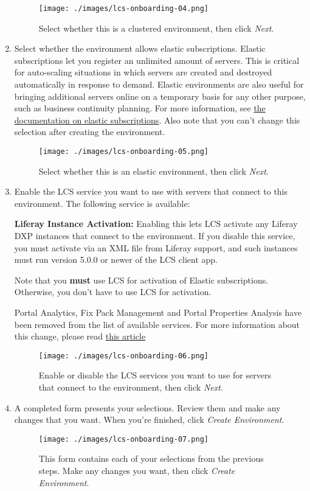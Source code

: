 \begin{enumerate}
  \begin{figure}
  \centering
  \texttt{[image: ./images/lcs-onboarding-04.png]}
  \caption{Select whether this is a clustered environment, then click
  \emph{Next}.}
  \end{figure}
\item
  Select whether the environment allows elastic subscriptions. Elastic
  subscriptions let you register an unlimited amount of servers. This is
  critical for auto-scaling situations in which servers are created and
  destroyed automatically in response to demand. Elastic environments
  are also useful for bringing additional servers online on a temporary
  basis for any other purpose, such as business continuity planning. For
  more information, see
  \href{/docs/7-2/deploy/-/knowledge_base/d/managing-liferay-dxp-subscriptions\#elastic-subscriptions}{the
  documentation on elastic subscriptions}. Also note that you can't
  change this selection after creating the environment.

  \begin{figure}
  \centering
  \texttt{[image: ./images/lcs-onboarding-05.png]}
  \caption{Select whether this is an elastic environment, then click
  \emph{Next}.}
  \end{figure}
\item
  Enable the LCS service you want to use with servers that connect to
  this environment. The following service is available:

  \textbf{Liferay Instance Activation:} Enabling this lets LCS activate
  any Liferay DXP instances that connect to the environment. If you
  disable this service, you must activate via an XML file from Liferay
  support, and such instances must run version 5.0.0 or newer of the LCS
  client app.

  Note that you \textbf{must} use LCS for activation of Elastic
  subscriptions. Otherwise, you don't have to use LCS for activation.

  Portal Analytics, Fix Pack Management and Portal Properties Analysis
  have been removed from the list of available services. For more
  information about this change, please read
  \href{https://help.liferay.com/hc/en-us/articles/360037317691-Liferay-Connected-Services-Feature-Deprecation-Update-March-2020}{this
  article}

  \begin{figure}
  \centering
  \texttt{[image: ./images/lcs-onboarding-06.png]}
  \caption{Enable or disable the LCS services you want to use for
  servers that connect to the environment, then click \emph{Next}.}
  \end{figure}
\item
  A completed form presents your selections. Review them and make any
  changes that you want. When you're finished, click \emph{Create
  Environment}.

  \begin{figure}
  \centering
  \texttt{[image: ./images/lcs-onboarding-07.png]}
  \caption{This form contains each of your selections from the previous
  steps. Make any changes you want, then click \emph{Create
  Environment}.}
  \end{figure}
\end{enumerate}

